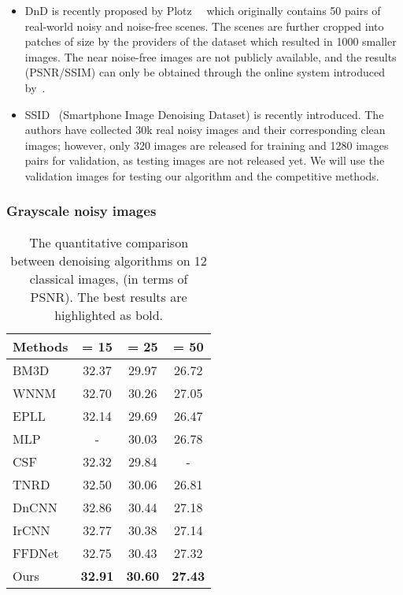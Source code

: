 \documentclass[10pt,twocolumn,letterpaper]{article}
\begin{document}
\begin{itemize}
\item DnD is recently proposed by Plotz~\etal~\cite{plotz2017benchmarking}  which originally contains 50 pairs of real-world noisy and noise-free scenes. The scenes are further cropped into patches of size   by the providers of the dataset which resulted in 1000 smaller images. The near noise-free images are not publicly available, and the results (PSNR/SSIM) can only be obtained through the online system introduced by~\cite{plotz2017benchmarking}.

\item SSID~\cite{abdelhamed2018high} (Smartphone Image Denoising Dataset) is recently introduced.  The authors have collected 30k real noisy images and their corresponding clean images; however, only 320 images are released for training and 1280 images pairs for validation, as testing images are not released yet. We will use the validation images for testing our algorithm and the competitive methods. 
\end{itemize}

\subsubsection{Grayscale noisy images}
\begin{table}\centering
\begin{tabular}{|l||ccc|}\hline 
Methods    &    = 15 &  = 25    &    = 50 \\ \hline \hline
BM3D~\cite{Dabov2007BM3D}    & 32.37 &   29.97  &   26.72 \\
WNNM~\cite{Gu2014WNN}        & 32.70 &   30.26  &   27.05 \\
EPLL~\cite{Zoran2011EPLL}    & 32.14 &   29.69  &   26.47 \\
MLP~\cite{Burger2012MLP}     & -     &   30.03  &   26.78 \\
CSF~\cite{schmidt2014CSF}    & 32.32 &   29.84  &    -    \\
TNRD~\cite{chen2017TNRD}     & 32.50 &   30.06  &   26.81 \\
DnCNN~\cite{zhang2017DnCNN}  & 32.86 &   30.44  &   27.18 \\
IrCNN ~\cite{zhang2017IRCNN} & 32.77 &   30.38  &   27.14 \\ 
FFDNet~\cite{zhang2018ffdnet}& 32.75 &   30.43  &   27.32 \\
Ours                         & \textbf{32.91} &   \textbf{30.60}  &   \textbf{27.43} \\ \hline \hline
\end{tabular}
\caption{The quantitative comparison between denoising algorithms on 12 classical images, (in terms of PSNR). The best results are highlighted as bold.}
\label{table:classical}
\vspace*{-3mm}
\end{table}
\end{document}
